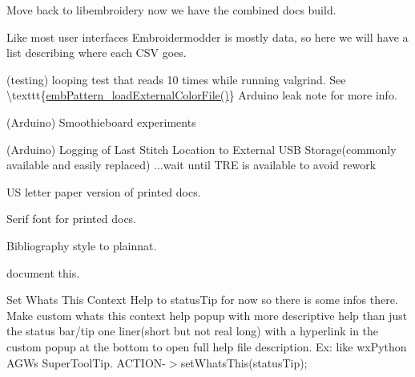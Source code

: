 \begin{DoxyRefList}
\label{todo__todo000204}%
%
Move back to libembroidery now we have the combined docs build.

\label{todo__todo000200}%
%
Like most user interfaces Embroidermodder is mostly data, so here we will have a list describing where each CSV goes.

\label{todo__todo000199}%
%
(testing) looping test that reads 10 times while running valgrind. See \textbackslash{}texttt\{\mbox{\hyperlink{embroidery_8h_a3bf191bd99e2da8d36465f454a4646f6}{emb\+Pattern\+\_\+load\+External\+Color\+File()}}\} Arduino leak note for more info.

\label{todo__todo000198}%
%
(Arduino) Smoothieboard experiments

\label{todo__todo000196}%
%
(Arduino) Logging of Last Stitch Location to External USB Storage(commonly available and easily replaced) ...wait until TRE is available to avoid rework 
\item[Page \mbox{\hyperlink{_ideas}{Ideas}} ]\label{todo__todo000191}%
%
US letter paper version of printed docs.

\label{todo__todo000190}%
%
Serif font for printed docs.

\label{todo__todo000189}%
%
Bibliography style to plainnat. 
\item[Member \mbox{\hyperlink{embroidermodder_8h_a59b98c3061d780d55cc048bcce8b47d0}{Index}} ]\label{todo__todo000002}%
%
document this.  
\item[Member \mbox{\hyperlink{class_main_window_a5de9bc12f363ba45fb8082f262d24deb}{Main\+Window\+::create\+All\+Actions}} ()]\label{todo__todo000003}%
%
Set What\textquotesingle{}s This Context Help to status\+Tip for now so there is some infos there. Make custom whats this context help popup with more descriptive help than just the status bar/tip one liner(short but not real long) with a hyperlink in the custom popup at the bottom to open full help file description. Ex\+: like wx\+Python AGW\textquotesingle{}s Super\+Tool\+Tip. ACTION-\/\texorpdfstring{$>$}{>}set\+Whats\+This(status\+Tip); 




\end{DoxyRefList}
